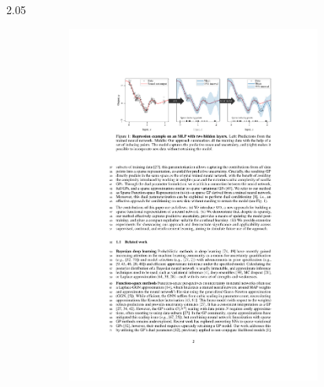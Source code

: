 \documentclass[final,12pt]{beamer}
\newlength{\colwidth}
\newlength\figureheight
\newlength\figurewidth
\begin{document}
\begin{frame}[t]
\begin{columns}[t]
\begin{column}{2.05\colwidth}
\begin{minipage}{\textwidth}
    \begin{figure}[t!]
    \begin{subfigure}[b]{0.65\textwidth}\centering
    \centering\scriptsize
    \includegraphics[width=0.92\textwidth]{fig/regression.pdf}

\end{subfigure}
\end{figure}
\end{minipage}
\end{column}
\end{columns}
\end{frame}
\end{document}
